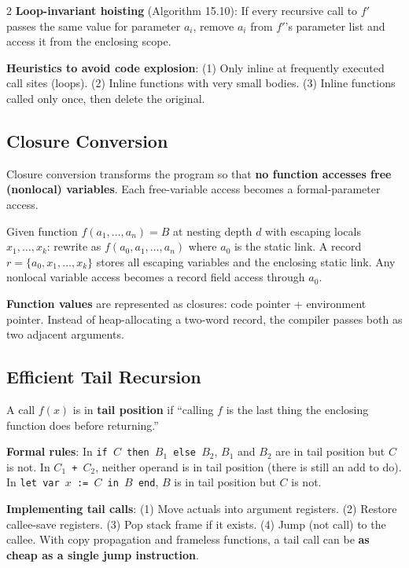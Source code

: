 \documentclass[9pt,landscape]{extarticle}
\begin{document}
\begin{multicols}{2}
\textbf{Loop-invariant hoisting} (Algorithm 15.10): If every recursive call to $f'$ passes the same value for parameter $a_i$, remove $a_i$ from $f'$'s parameter list and access it from the enclosing scope.

\textbf{Heuristics to avoid code explosion}: (1) Only inline at frequently executed call sites (loops). (2) Inline functions with very small bodies. (3) Inline functions called only once, then delete the original.

\subsection{Closure Conversion}

Closure conversion transforms the program so that \textbf{no function accesses free (nonlocal) variables}. Each free-variable access becomes a formal-parameter access.

Given function $f(a_1, \ldots, a_n) = B$ at nesting depth $d$ with escaping locals $x_1, \ldots, x_k$: rewrite as $f(a_0, a_1, \ldots, a_n)$ where $a_0$ is the static link. A record $r = \{a_0, x_1, \ldots, x_k\}$ stores all escaping variables and the enclosing static link. Any nonlocal variable access becomes a record field access through $a_0$.

\textbf{Function values} are represented as closures: code pointer + environment pointer. Instead of heap-allocating a two-word record, the compiler passes both as two adjacent arguments.

\subsection{Efficient Tail Recursion}

A call $f(x)$ is in \textbf{tail position} if ``calling $f$ is the last thing the enclosing function does before returning.''

\textbf{Formal rules}: In \texttt{if $C$ then $B_1$ else $B_2$}, $B_1$ and $B_2$ are in tail position but $C$ is not. In \texttt{$C_1$ + $C_2$}, neither operand is in tail position (there is still an add to do). In \texttt{let var $x$ := $C$ in $B$ end}, $B$ is in tail position but $C$ is not.

\textbf{Implementing tail calls}: (1) Move actuals into argument registers. (2) Restore callee-save registers. (3) Pop stack frame if it exists. (4) Jump (not call) to the callee. With copy propagation and frameless functions, a tail call can be \textbf{as cheap as a single jump instruction}.


\end{multicols}
\end{document}
